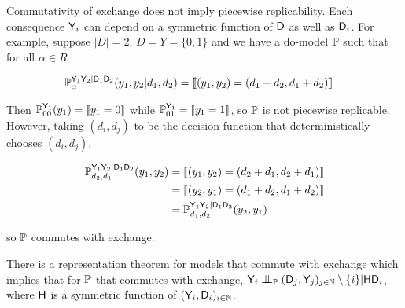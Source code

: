 Commutativity of exchange does not imply piecewise replicability. Each consequence $\mathsf{Y}_i$ can depend on a symmetric function of $\mathsf{D}$ as well as $\mathsf{D}_i$. For example, suppose $|D|=2$, $D=Y=\{0,1\}$ and we have a do-model $\mathbb{P}$ such that for all $\alpha\in R$

\begin{align}
    \mathbb{P}_\alpha^{\mathsf{Y}_1\mathsf{Y}_2|\mathsf{D}_1\mathsf{D}_2}(y_1,y_2|d_1,d_2) &= \llbracket (y_1,y_2)= (d_1+d_2,d_1+d_2) \rrbracket
\end{align}

Then $\mathbb{P}_{00}^{\mathsf{Y}_1}(y_1) = \llbracket y_1=0\rrbracket$ while $\mathbb{P}_{01}^{\mathsf{Y}_1} = \llbracket y_1=1 \rrbracket$, so $\mathbb{P}$ is not piecewise replicable. However, taking $(d_i,d_j)$ to be the decision function that deterministically chooses $(d_i,d_j)$,

\begin{align}
    \mathbb{P}_{d_2,d_1}^{\mathsf{Y}_1\mathsf{Y}_2|\mathsf{D}_1\mathsf{D}_2}(y_1,y_2) &= \llbracket (y_1,y_2)= (d_2+d_1,d_2+d_1) \rrbracket\\
    &= \llbracket (y_2,y_1)= (d_1+d_2,d_1+d_2) \rrbracket\\
    &= \mathbb{P}_{d_1,d_2}^{\mathsf{Y}_1\mathsf{Y}_2|\mathsf{D}_1\mathsf{D}_2}(y_2,y_1)
\end{align}

so $\mathbb{P}$ commutes with exchange.

There is a representation theorem for models that commute with exchange which implies that for $\mathbb{P}$ that commutes with exchange, $\RV{Y}_i\CI_{\prob{P}}(\RV{D}_j,\RV{Y}_j)_{j\in \mathbb{N}}\setminus \{i\}|\RV{H}\RV{D}_i$, where $\mathsf{H}$ is a symmetric function of $(\mathsf{Y}_i,\mathsf{D}_i)_{i\in\mathbb{N}}$.


